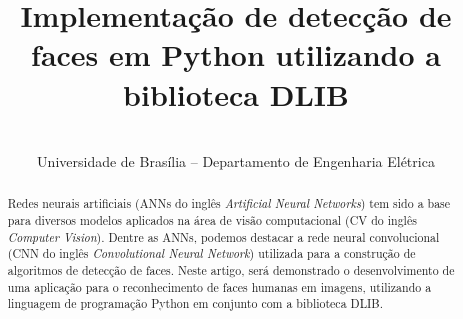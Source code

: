 \documentclass[conference]{IEEEtran}
\begin{document}
\title{Implementação de detecção de faces em Python utilizando a biblioteca DLIB}


\author{
\and
{}
\\
Universidade de Brasília – Departamento de Engenharia Elétrica
}

\maketitle

\begin{abstract}
 Redes neurais artificiais (ANNs do inglês \textit{Artificial Neural Networks}) tem sido a base para diversos modelos aplicados na área de visão computacional (CV do inglês \textit{Computer Vision}). Dentre as ANNs, podemos destacar a rede neural convolucional (CNN do inglês \textit{Convolutional Neural Network}) utilizada para a construção de algoritmos de detecção de faces. Neste artigo, será demonstrado o desenvolvimento de uma aplicação para o reconhecimento de faces humanas em imagens, utilizando a linguagem de programação Python em conjunto com a biblioteca DLIB. 
\end{abstract}
\end{document}
